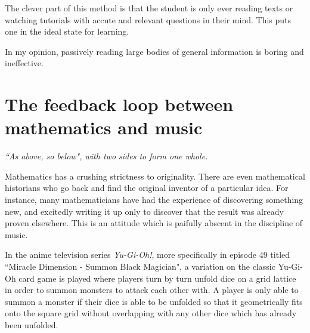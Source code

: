 \documentclass[12pt]{book}
\theoremstyle{plain}
\theoremstyle{definition}
\begin{document}
	The clever part of this method is that the student is only ever reading texts or watching tutorials with accute and relevant questions in their mind. This puts one in the ideal state for learning.
	
	In my opinion, passively reading large bodies of general information is boring and ineffective.
	
\section{The feedback loop between mathematics and music}
\begin{center}
	\emph{``As above, so below", with two sides to form one whole.}
	\end{center}
Mathematics has a crushing strictness to originality. There are even mathematical historians who go back and find the original inventor of a particular idea. For instance, many mathematicians have had the experience of discovering something new, and excitedly writing it up only to discover that the result was already proven elsewhere. This is an attitude which is paifully abscent in the discipline of music.

In the anime television series \emph{Yu-Gi-Oh!}, more specifically in episode 49 titled ``Miracle Dimension - Summon Black Magician", a variation on the classic Yu-Gi-Oh card game is played where players turn by turn unfold dice on a grid lattice in order to summon monsters to attack each other with. A player is only able to summon a monster if their dice is able to be unfolded so that it geometrically fits onto the square grid without overlapping with any other dice which has already been unfolded.
\end{document}
